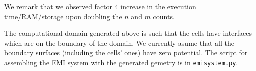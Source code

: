 \documentclass[11pt,a4paper]{article}
\begin{document}
We remark that we observed factor 4 increase in the execution time/RAM/storage upon doubling 
the $n$ and $m$ counts. 

The computational domain generated above is such that the cells have interfaces which are on 
the boundary of the domain. We currently asume that all the boundary surfaces (including the cells' 
ones) have zero potential. The script for assembling the EMI system with the generated gemetry is
in \texttt{emi\textunderscore system.py}.


\end{document}

